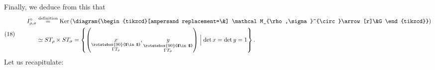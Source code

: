 Finally, we deduce from this that
\[
 (18)\qquad
 \begin{aligned}
 I_{\rho,\sigma}^{\circ}&\overset{\text{definition}}{=}
 \operatorname{Ker}\left(
 \diagram{\begin{tikzcd}[ampersand replacement=\&]
 \mathcal M_{\rho,\sigma}^{\circ}\arrow[r]\&G
 \end{tikzcd}}\right)\\
 &\simeq ST_\rho\times ST_\sigma
 =\left\{\left(
 \underset{\substack{\rotatebox{90}{$\in$}\\\Gamma T_\rho}}{x},
 \underset{\substack{\rotatebox{90}{$\in$}\\\Gamma T_\sigma}}{y}
 \right)\mathrel{\Big|}\det x=\det y=1\right\}.
 \end{aligned}
\]
Let us recapitulate:

